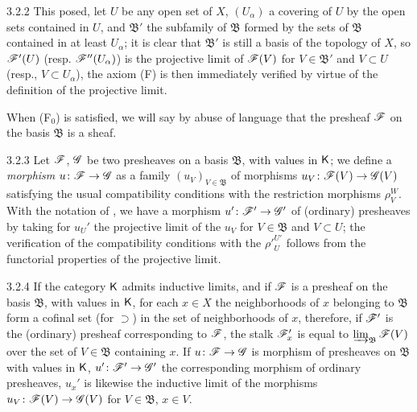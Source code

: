 \documentclass{book}
\begin{document}
\begin{env}{3.2.2}
This posed, let $U$ be any open set of $X$, $(U_\alpha)$ a covering of $U$ by
the open sets contained in $U$, and $\mathfrak{B}'$ the subfamily of $\mathfrak{B}$ formed by the sets
of $\mathfrak{B}$ contained in at least $U_\alpha$; it is clear that $\mathfrak{B}'$ is still a basis
of the topology of $X$, so $\mathscr{F}'(U)$ (resp. $\mathscr{F}''(U_\alpha)$) is the projective limit of $\mathscr{F}(V)$ for $V\in\mathfrak{B}'$
and $V\subset U$ (resp., $V\subset U_\alpha$), the axiom (F) is then immediately verified by virtue of the definition of the
projective limit.

When (F$_0$) is satisfied, we will say by abuse of language that the presheaf $\mathscr{F}$ on the basis $\mathfrak{B}$ is a sheaf.
\end{env}

\begin{env}{3.2.3}
\label{env-0.3.2.3}
Let $\mathscr{F}$, $\mathscr{G}$ be two presheaves on a basis $\mathfrak{B}$, with values in $\mathsf{K}$; we define a \emph{morphism}
$u\colon\mathscr{F}\to\mathscr{G}$ as a family $(u_V)_{V\in\mathfrak{B}}$ of morphisms $u_V\colon\mathscr{F}(V)\to\mathscr{G}(V)$ satisfying the usual
compatibility conditions with the restriction morphisms $\rho_V^W$. With the notation of ,
we have a morphism $u'\colon\mathscr{F}'\to\mathscr{G}'$ of (ordinary) presheaves by taking for $u_U'$ the projective limit
of the $u_V$ for $V\in\mathfrak{B}$ and $V\subset U$; the verification of the compatibility conditions with
the ${\rho'}_U^{U'}$ follows from the functorial properties of the projective limit.
\end{env}

\begin{env}{3.2.4}
\label{env-0.3.2.4}
If the category $\mathsf{K}$ admits inductive limits, and if $\mathscr{F}$ is a presheaf on the basis $\mathfrak{B}$, with
values in $\mathsf{K}$, for each $x\in X$ the neighborhoods of $x$ belonging to $\mathfrak{B}$ form a cofinal set
(for $\supset$) in the set of neighborhoods of $x$, therefore, if $\mathscr{F}'$ is the (ordinary) presheaf
corresponding to $\mathscr{F}$, the stalk $\mathscr{F}_x'$ is equal to $\varinjlim_{\mathfrak{B}}\mathscr{F}(V)$ over the set of
$V\in\mathfrak{B}$ containing $x$. If $u\colon\mathscr{F}\to\mathscr{G}$ is morphism of presheaves on $\mathfrak{B}$ with values in
$\mathsf{K}$, $u'\colon\mathscr{F}'\to\mathscr{G}'$ the corresponding morphism of ordinary presheaves, $u_x'$ is likewise the
inductive limit of the morphisms $u_V\colon\mathscr{F}(V)\to\mathscr{G}(V)$ for $V\in\mathfrak{B}$, $x\in V$.
\end{env}
\end{document}
